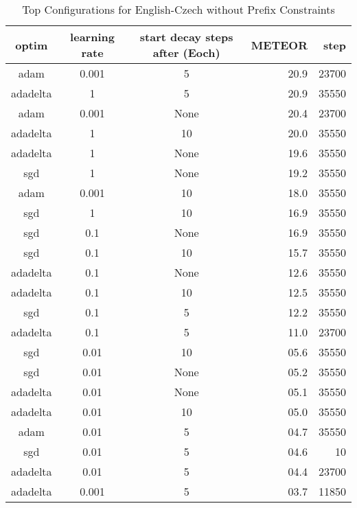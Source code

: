 \begin{table}
	\caption{Top Configurations for English-Czech without Prefix Constraints}
	\label{tab:ranking_example}
	\centering
\begin{tabular}{|c|c|c|r|r|}
	\hline
	optim   & learning rate & start decay steps after (Eoch)  & METEOR &  step \\
	\hline
	   adam   &     0.001     &        5        & 20.9 & 23700 \\
	 adadelta &       1       &        5        & 20.9 & 35550 \\
	   adam   &     0.001     & None        & 20.4 & 23700 \\
	 adadelta &       1       &       10        & 20.0 & 35550 \\
	 adadelta &       1       & None        & 19.6 & 35550 \\
	   sgd    &       1       & None        & 19.2 & 35550 \\
	   adam   &     0.001     &       10        & 18.0 & 35550 \\
	   sgd    &       1       &       10        & 16.9 & 35550 \\
	   sgd    &      0.1      & None        & 16.9 & 35550 \\
	   sgd    &      0.1      &       10        & 15.7 & 35550 \\
	 adadelta &      0.1      & None        & 12.6 & 35550 \\
	 adadelta &      0.1      &       10        & 12.5 & 35550 \\
	   sgd    &      0.1      &        5        & 12.2 & 35550 \\
	 adadelta &      0.1      &        5        & 11.0 & 23700 \\
	   sgd    &      0.01     &       10        & 05.6 & 35550 \\
	   sgd    &      0.01     & None        & 05.2 & 35550 \\
	 adadelta &      0.01     & None        & 05.1 & 35550 \\
	 adadelta &      0.01     &       10        & 05.0 & 35550 \\
	   adam   &      0.01     &        5        & 04.7 & 35550 \\
	   sgd    &      0.01     &        5        & 04.6 & 10 \\
	 adadelta &      0.01     &        5        & 04.4 & 23700 \\
	 adadelta &     0.001     &        5        & 03.7 & 11850 \\

\end{tabular}
\end{table}
